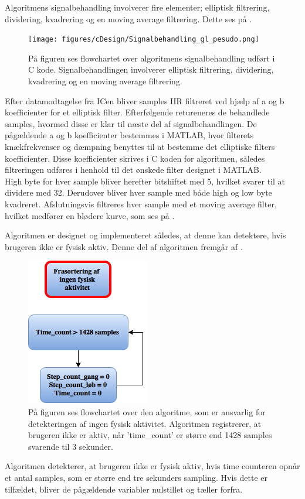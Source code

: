 Algoritmens signalbehandling involverer fire elementer; elliptisk filtrering, dividering, kvadrering og en moving average filtrering. Dette ses på .
\begin{figure}[H]
	\centering
	\texttt{[image: figures/cDesign/Signalbehandling\_gl\_pesudo.png]}
	\caption{På figuren ses flowchartet over algoritmens signalbehandling udført i C kode. Signalbehandlingen involverer elliptisk filtrering, dividering, kvadrering og en moving average filtrering.}
	\label{fig:signalbehandling_g_l}
\end{figure}\vspace{-0.25cm}
Efter datamodtagelse fra ICen bliver samples IIR filtreret ved hjælp af a og b koefficienter for et elliptisk filter. Efterfølgende retureneres de behandlede samples, hvormed disse er klar til næste del af signalbehandlingen. De pågældende a og b koefficienter bestemmes i MATLAB, hvor filterets knækfrekvenser og dæmpning benyttes til at bestemme det elliptiske filters koefficienter. Disse koefficienter skrives i C koden for algoritmen, således filtreringen udføres i henhold til det ønskede filter designet i MATLAB.\\
High byte for hver sample bliver herefter bitshiftet med 5, hvilket svarer til at dividere med 32. Derudover bliver hver sample med både high og low byte kvadreret. Afslutningsvis filtreres hver sample med et moving average filter, hvilket medfører en blødere kurve, som ses på .

Algoritmen er designet og implementeret således, at denne kan detektere, hvis brugeren ikke er fysisk aktiv. Denne del af algoritmen fremgår af .
\begin{figure}[H]
	\centering
	\includegraphics[scale=0.6]{figures/cDesign/ingen_aktivitet_gl_pseudo.png}
	\caption{På figuren ses flowchartet over den algoritme, som er ansvarlig for detekteringen af ingen fysisk aktivitet. Algoritmen registrerer, at brugeren ikke er aktiv, når 'time\_count' er større end 1428 samples svarende til 3 sekunder.}
	\label{fig:ingen_ak_pseudo}
\end{figure}\vspace{-0.25cm}
Algoritmen detekterer, at brugeren ikke er fysisk aktiv, hvis time counteren opnår et antal samples, som er større end tre sekunders sampling. Hvis dette er tilfældet, bliver de pågældende variabler nulstillet og tæller forfra.

